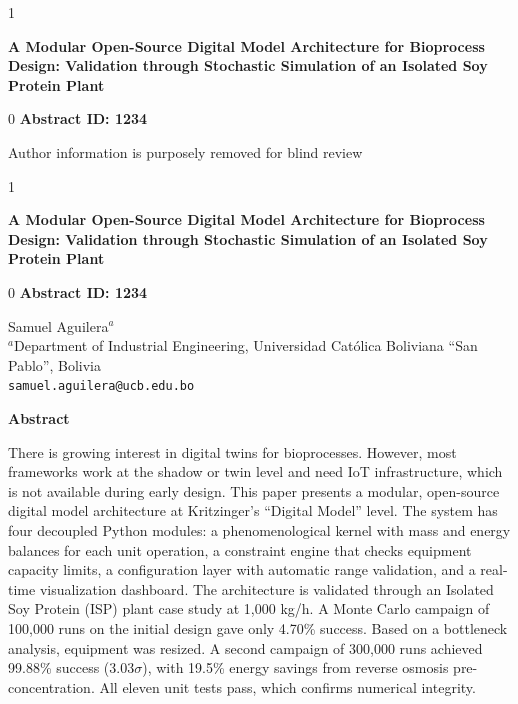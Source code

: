 \documentclass[10pt]{article}
\def\blind{1}
\def\final{0}
\begin{document}
\thispagestyle{firstpage}

\blind
\begin{center}
{\fontsize{16}{19}\bfseries\selectfont
A Modular Open-Source Digital Model Architecture for Bioprocess Design: Validation through Stochastic Simulation of an Isolated Soy Protein Plant}

\vspace{10pt}

\final
{\fontsize{12}{14}\bfseries\selectfont Abstract ID: 1234}
\vspace{10pt}
\fi

{\fontsize{10}{12}\selectfont Author information is purposely removed for blind review}
\end{center}
\fi

\blind
\begin{center}
{\fontsize{16}{19}\bfseries\selectfont
A Modular Open-Source Digital Model Architecture for Bioprocess Design: Validation through Stochastic Simulation of an Isolated Soy Protein Plant}

\vspace{10pt}

\final
{\fontsize{12}{14}\bfseries\selectfont Abstract ID: 1234}
\vspace{10pt}
\fi

{\fontsize{10}{12}\selectfont
Samuel Aguilera$^{a}$ \\
\vspace{5pt}
$^{a}$Department of Industrial Engineering, Universidad Cat\'olica Boliviana ``San Pablo'', Bolivia \\
\texttt{samuel.aguilera@ucb.edu.bo}}
\end{center}
\fi

\vspace{10pt}

\begin{center}
{\fontsize{12}{14}\bfseries\selectfont Abstract}
\end{center}

There is growing interest in digital twins for bioprocesses. However, most frameworks work at the shadow or twin level and need IoT infrastructure, which is not available during early design. This paper presents a modular, open-source digital model architecture at Kritzinger's ``Digital Model'' level. The system has four decoupled Python modules: a phenomenological kernel with mass and energy balances for each unit operation, a constraint engine that checks equipment capacity limits, a configuration layer with automatic range validation, and a real-time visualization dashboard. The architecture is validated through an Isolated Soy Protein (ISP) plant case study at 1,000 kg/h. A Monte Carlo campaign of 100,000 runs on the initial design gave only 4.70\% success. Based on a bottleneck analysis, equipment was resized. A second campaign of 300,000 runs achieved 99.88\% success (3.03$\sigma$), with 19.5\% energy savings from reverse osmosis pre-concentration. All eleven unit tests pass, which confirms numerical integrity.
\end{document}
